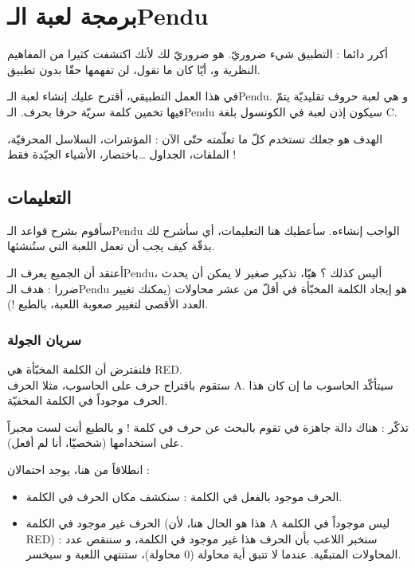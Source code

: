 \chapter{برمجة لعبة الـ\textenglish{Pendu}}

أكرر دائما : التطبيق شيء ضروريّ. هو ضروريّ لك لأنك اكتشفت كثيرا من المفاهيم النظرية و، أيّا كان ما تقول، لن تفهمها حقّا بدون تطبيق.

في هذا العمل التطبيقي، أقترح عليك إنشاء لعبة الـ\textenglish{Pendu}.
و هي لعبة حروف تقليديّة يتمّ فيها تخمين كلمة سريّة حرفا بحرف. الـ\textenglish{Pendu}
سيكون إذن لعبة في الكونسول بلغة
\textenglish{C}.

الهدف هو جعلك تستخدم كلّ ما تعلّمته حتّى الآن : المؤشرات، السلاسل المحرفيّة، الملفات، الجداول \dots باختصار، الأشياء الجيّدة فقط !

\section{التعليمات}

سأقوم بشرح قواعد الـ\textenglish{Pendu}
الواجب إنشاءه. سأعطيك هنا التعليمات، أي سأشرح لك بدقّة كيف يجب أن تعمل اللعبة التي ستُنشئها.

أعتقد أن الجميع يعرف
الـ\textenglish{Pendu}،
أليس كذلك ؟ هيّا، تذكير صغير لا يمكن أن يحدث ضررا : هدف الـ\textenglish{Pendu}
هو إيجاد الكلمة المخبّأة في أقلّ من عشر محاولات (يمكنك تغيير العدد الأقصى لتغيير صعوبة اللعبة، بالطبع !).

\subsection{سريان الجولة}
فلنفترض أن الكلمة المخبّأة هي \textenglish{RED}.\\
ستقوم باقتراح حرف على الحاسوب، مثلا الحرف
\textenglish{A}.
سيتأكّد الحاسوب ما إن كان هذا الحرف موجوداً في الكلمة المخفيّة.

\begin{information}
تذكّر : هناك دالة جاهزة في
تقوم بالبحث عن حرف في كلمة ! و بالطبع أنت لست مجبراً على استخدامها (شخصيّا، أنا لم أفعل).
\end{information}

انطلاقاً من هنا، يوجد احتمالان :

\begin{itemize}
  \item الحرف موجود بالفعل في الكلمة : سنكشف مكان الحرف في الكلمة.
  \item الحرف غير موجود في الكلمة (هذا هو الحال هنا، لأن
\textenglish{A}
ليس موجوداً في الكلمة
\textenglish{RED}) :
سنخبر اللاعب بأن الحرف هذا غير موجود في الكلمة، و سننقص عدد المحاولات المتبقّية. عندما لا تتبق أية محاولة (0 محاولة)، ستنتهي اللعبة و سيخسر.
\end{itemize}


